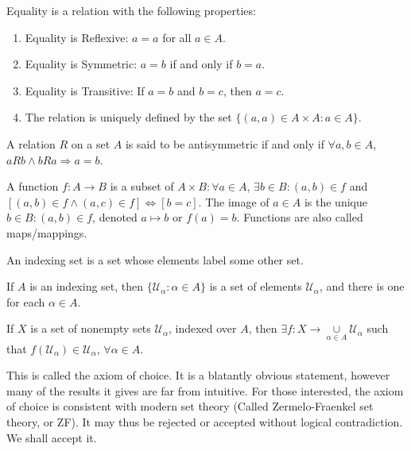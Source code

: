 \documentclass[crop=false,class=book,oneside]{standalone}
\begin{document}
        \begin{definition}
        Equality is a relation with the following properties:
        \begin{enumerate}
        \item Equality is Reflexive: $a=a$ for all $a\in A$.
        \item Equality is Symmetric: $a=b$ if and only if $b=a$.
        \item Equality is Transitive: If $a=b$ and $b=c$, then $a=c$.
        \item The relation is uniquely defined by the set $\{(a,a)\in A\times A:a\in A\}$.
        \end{enumerate}
        \end{definition}
        \begin{definition}
        A relation $R$ on a set $A$ is said to be antisymmetric if and only if $\forall a,b \in A$, $aRb\land bRa\Rightarrow a=b$.
        \end{definition}
        \begin{definition}
        A function $f:A\rightarrow B$ is a subset of $A\times B: \forall a\in A$, $\exists b\in B: (a,b)\in f$ and $[(a,b)\in f\land (a,c)\in f]\Leftrightarrow [b=c]$. The image of $a\in A$ is the unique $b\in B:(a,b)\in f$, denoted $a\mapsto b$ or $f(a)=b$. Functions are also called maps/mappings.
        \end{definition}
        \begin{definition}
        An indexing set is a set whose elements label some other set.
        \end{definition}
        \begin{example}
        If $A$ is an indexing set, then $\{\mathcal{U}_{\alpha}:\alpha \in A\}$ is a set of elements $\mathcal{U}_{\alpha}$, and there is one for each $\alpha \in A$.
        \end{example}
        \begin{axiom}
        If $X$ is a set of nonempty sets $\mathcal{U}_{\alpha}$, indexed over $A$, then $\exists f:X\rightarrow \underset{\alpha \in A}\cup \mathcal{U}_{\alpha}$ such that $f(\mathcal{U}_{\alpha}) \in \mathcal{U}_{\alpha}$, $\forall \alpha\in A$.
        \end{axiom}
        \begin{remark}
        This is called the axiom of choice. It is a blatantly obvious statement, however many of the results it gives are far from intuitive. For those interested, the axiom of choice is consistent with modern set theory (Called Zermelo-Fraenkel set theory, or ZF). It may thus be rejected or accepted without logical contradiction. We shall accept it.
        \end{remark}
\end{document}
